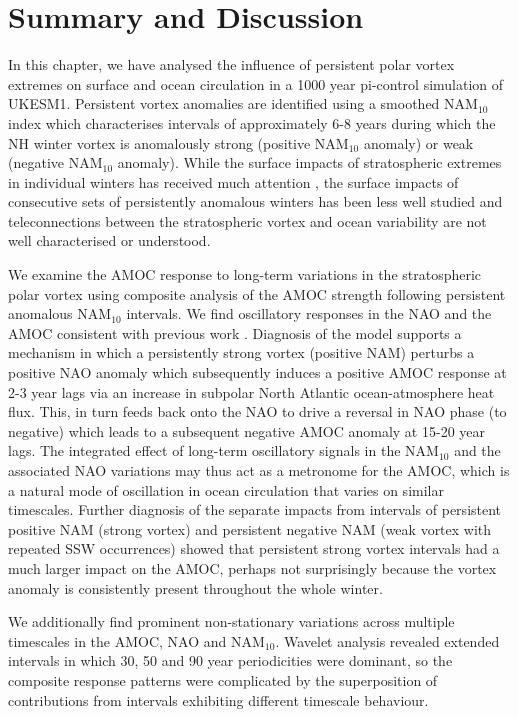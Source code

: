 \section{Summary and Discussion}
In this chapter, we have analysed the influence of persistent polar vortex extremes on surface and ocean circulation in a 1000 year pi-control simulation of UKESM1. Persistent vortex anomalies are identified using a smoothed NAM$_{10}$ index which characterises intervals of approximately 6-8 years during which the NH winter vortex is anomalously strong (positive NAM$_{10}$ anomaly) or weak (negative NAM$_{10}$ anomaly). While the surface impacts of stratospheric extremes in individual winters has received much attention \citep{baldwinStratospheric2001a, domeisenEstimating2019d, charlton-perezInfluence2018e}, the surface impacts of consecutive sets of persistently anomalous winters has been less well studied and teleconnections between the stratospheric vortex and ocean variability are not well characterised or understood. 

We examine the AMOC response to long-term variations in the stratospheric polar vortex using composite analysis of the AMOC strength following persistent anomalous NAM$_{10}$ intervals. We find oscillatory responses in the NAO and the AMOC consistent with previous work \citep{reichlerStratospheric2012b}. Diagnosis of the model supports a mechanism in which a persistently strong vortex (positive NAM) perturbs a positive NAO anomaly which subsequently induces a positive AMOC response at 2-3 year lags via an increase in subpolar North Atlantic ocean-atmosphere heat flux. This, in turn feeds back onto the NAO to drive a reversal in  NAO phase (to negative) which leads to a subsequent negative AMOC anomaly at 15-20 year lags. The integrated effect of long-term oscillatory signals in the NAM$_{10}$ and the associated NAO variations may thus act as a metronome for the AMOC, which is a natural mode of oscillation in  ocean circulation that varies on similar timescales. Further diagnosis of the separate impacts from  intervals of persistent positive NAM (strong vortex) and persistent negative NAM (weak vortex with repeated SSW occurrences) showed that persistent strong vortex intervals had a much larger impact on the AMOC, perhaps not surprisingly because the vortex anomaly is consistently present throughout the whole winter.

We additionally find prominent non-stationary variations across multiple timescales in the AMOC, NAO and NAM$_{10}$. Wavelet analysis revealed extended intervals in  which 30, 50 and 90 year periodicities were dominant, so the composite response patterns were complicated by  the superposition of contributions from intervals exhibiting different timescale behaviour. 

